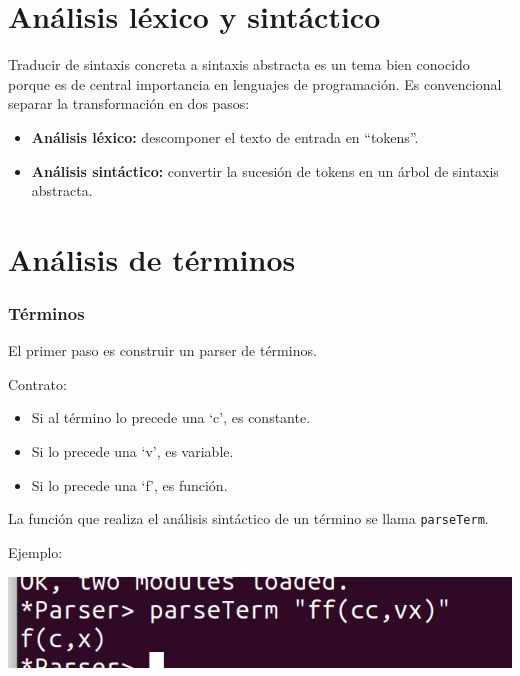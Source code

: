 \documentclass{beamer}
\begin{document}
\section{Análisis léxico y sintáctico}

\begin{frame}
Traducir de sintaxis concreta a sintaxis abstracta es un tema bien conocido porque es de central importancia en lenguajes de programación. Es convencional separar la transformación en dos pasos:

\pause

\begin{itemize}
\item \textbf{Análisis léxico:} descomponer el texto de entrada en ``tokens''.

\pause

\item \textbf{Análisis sintáctico:} convertir la sucesión de tokens en un árbol de sintaxis abstracta.
\end{itemize}

\end{frame}

\section{Análisis de términos}

\begin{frame}
\frametitle{Términos}

El primer paso es construir un parser de términos.

Contrato:
\begin{itemize}
\item Si al término lo precede una `c', es constante.
\item Si lo precede una `v', es variable.
\item Si lo precede una `f', es función.
\end{itemize}

La función que realiza el análisis sintáctico de un término se llama \texttt{parseTerm}.

Ejemplo:

\includegraphics[scale=0.3]{parseTerm.png}

\end{frame}
\end{document}
